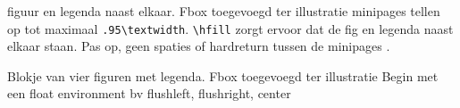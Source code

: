 \documentclass[../../main.tex]{subfiles}
\begin{document}
figuur en legenda  naast elkaar. Fbox toegevoegd ter illustratie
minipages tellen op tot maximaal \verb+.95\textwidth+.
\verb+\hfill+ zorgt ervoor dat de fig en legenda naast elkaar staan. Pas op, geen spaties of hardreturn tussen de minipages
.
\begin{flushleft}
{}%
\hfill%
%
\hfill%
\begin{minipage}{.45\textwidth}
\label{fig:dummylabel2}
\end{minipage}
\end{flushleft}

Blokje van vier figuren met legenda. Fbox toegevoegd ter illustratie
Begin met een float environment bv flushleft, flushright, center
\end{document}
